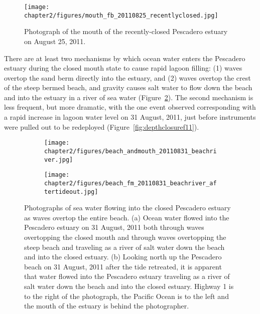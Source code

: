 \begin{figure}
\centering
		\texttt{[image: chapter2/figures/mouth\_fb\_20110825\_recentlyclosed.jpg]} \caption{Photograph of the mouth of the recently-closed Pescadero estuary on August 25, 2011.} \label{fig:mouth_fb_20110825}
\end{figure}



There are at least two mechanisms by which ocean water enters the Pescadero estuary during the closed mouth state to cause rapid lagoon filling: (1) waves overtop the sand berm directly into the estuary, and (2) waves overtop the crest of the steep bermed beach, and gravity causes salt water to flow down the beach and into the estuary in a river of sea water (Figure~\ref{fig:beachriver}). The second mechanism is less frequent, but more dramatic, with the one event observed corresponding with a rapid increase in lagoon water level on 31 August, 2011, just before instruments were pulled out to be redeployed (Figure~\ref{fig:depthclosuref11}).

\begin{figure}
\begin{subfigure}{.5\textwidth}
		\texttt{[image: chapter2/figures/beach\_andmouth\_20110831\_beachriver.jpg]}
\end{subfigure}
\begin{subfigure}{.5\textwidth}
		\texttt{[image: chapter2/figures/beach\_fm\_20110831\_beachriver\_aftertideout.jpg]}
\end{subfigure}   \caption{Photographs of sea water flowing into the closed Pescadero estuary as waves overtop the entire beach. (a) Ocean water flowed into the Pescadero estuary on 31 August, 2011 both through waves overtopping the closed mouth and through waves overtopping the steep beach and traveling as a river of salt water down the beach and into the closed estuary. (b) Looking north up the Pescadero beach on 31 August, 2011 after the tide retreated, it is apparent that water flowed into the Pescadero estuary traveling as a river of salt water down the beach and into the closed estuary. Highway 1 is to the right of the photograph, the Pacific Ocean is to the left and the mouth of the estuary is behind the photographer.} 		 \label{fig:beachriver} 
 \end{figure}

